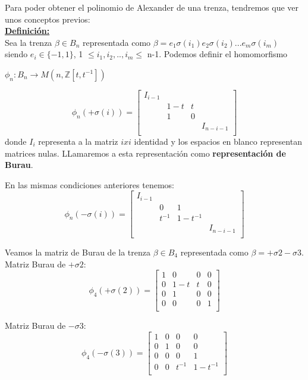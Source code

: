 \documentclass[14pt]{extarticle}
\begin{document}
Para poder obtener el polinomio de Alexander de una trenza, tendremos que ver unos conceptos previos:\\

\textbf{\underline{Definición:}}\\
Sea la trenza $\beta \in B_{n}$ representada como $\beta = e_{1} \sigma(i_{1}) e_{2} \sigma(i_{2}) ... e_{m} \sigma(i_{m}) $ siendo $e_{i} \in \{-1,1\}$, 1 $\le i_{1}, i_{2},..,i_{m} \le$ n-1. Podemos definir el homomorfismo
\begin{center}
	 $ \phi_{n} : B_{n}  \rightarrow  M(n,\mathds{Z}[t,t^{-1}])$	 
\end{center}
\[ \phi_{n} ( +\sigma (i)) = \begin{bmatrix}
I_{i-1} &  &  & \\
 & 1-t & t &  \\
 & 1 & 0 &  \\
 &  &  & I_{n-i-1} \\
\end{bmatrix}\]
donde $ I_{i} $ representa a la matriz $ ixi $ identidad y los espacios en blanco representan matrices nulas. LLamaremos a esta representación como \textbf{representación de Burau}.\\

\begin{pro}
	En las mismas condiciones anteriores tenemos:\\
	\[ \phi_{n} ( -\sigma (i)) = \begin{bmatrix}
	I_{i-1} &  &  & \\
	& 0 & 1 &  \\
	& t^{-1} & 1-t^{-1} &  \\	
	&  &  & I_{n-i-1} \\
	\end{bmatrix}\]
\end{pro}

\bigskip
Veamos la matriz de Burau de la trenza $\beta \in B_{4}$ representada como $\beta = +\sigma2-\sigma3$.\\
Matriz Burau de $ +\sigma2 $:
	\[ \phi_{4} ( +\sigma (2)) = \begin{bmatrix}
	1 & 0 & 0 & 0 \\
	0 & 1-t & t & 0  \\
	0 & 1 & 0 & 0 \\
	0 & 0 & 0 & 1 \\
	\end{bmatrix}\]

Matriz Burau de $ -\sigma3 $:
\[ \phi_{4} ( -\sigma (3)) = \begin{bmatrix}
	1 & 0 & 0 & 0 \\
	0 & 1 & 0 & 0 \\
	0 & 0 & 0 & 1  \\	
	0 & 0 & t^{-1} & 1-t^{-1} \\
\end{bmatrix}\]
 
\end{document}
